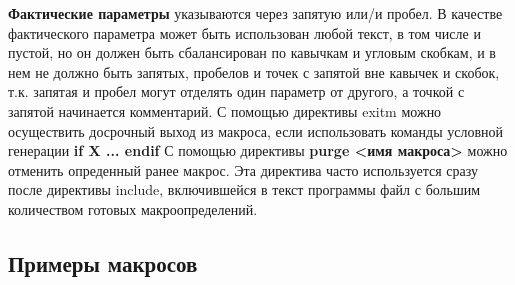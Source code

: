 \textbf{Фактические параметры} указываются через запятую или/и пробел. В качестве фактического параметра может быть использован любой текст, в том числе и пустой, но он должен быть сбалансирован по кавычкам и угловым скобкам, и в нем не должно быть запятых, пробелов и точек с запятой вне кавычек и скобок, т.к. запятая и пробел могут отделять один параметр от другого, а точкой с запятой начинается комментарий.
С помощью директивы exitm можно осуществить досрочный выход из макроса, если использовать команды условной генерации \textbf{if X ... endif}
С помощью директивы \textbf{purge <имя макроса>} можно отменить опреденный ранее макрос. Эта директива часто используется сразу после директивы include, включившейся в текст программы файл с большим количеством готовых макроопределений.

\subsection{Примеры макросов}
